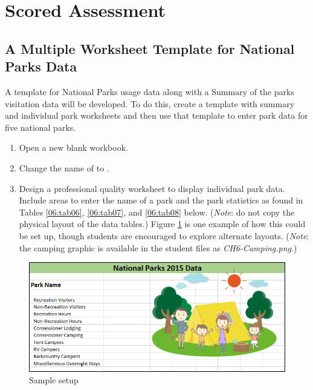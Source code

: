\section{Scored Assessment}

\subsection{A Multiple Worksheet Template for National Parks Data}

A template for National Parks usage data along with a Summary of the parks visitation data will be developed. To do this, create a template with summary and individual park worksheets and then use that template to enter park data for five national parks.

\begin{enumerate}
	\item Open a new blank workbook.
	\item Change the name of  to . 
	\item Design a professional quality worksheet to display individual park data. Include areas to enter the name of a park and the park statistics as found in Tables \ref{06:tab06}, \ref{06:tab07}, and \ref{06:tab08} below. (\textit{Note}: do not copy the physical layout of the data tables.) Figure \ref{06:fig17} is one example of how this could be set up, though students are encouraged to explore alternate layouts. (\textit{Note}: the camping graphic is available in the student files as \textit{CH6-Camping.png}.)
\end{enumerate}

\begin{figure}[H]
	\centering
	\includegraphics[width=\maxwidth{.95\linewidth}]{gfx/ch06_fig17}
	\caption{Sample setup}
	\label{06:fig17}
\end{figure}

